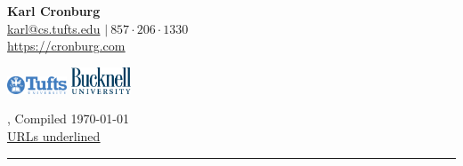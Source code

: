 
\usepackage[margin=0.6in]{geometry}
\usepackage[parfill]{parskip}
\usepackage[utf8]{inputenc}
\usepackage{amsmath,amssymb,amsfonts,amsthm}
\usepackage{graphicx} %
\usepackage{setspace} %
\usepackage{hyperref} %
\usepackage{enumitem}
\usepackage{xcolor}
\usepackage{soul}


\hypersetup{
    colorlinks=true,
    linkcolor=blue,
    filecolor=magenta,
    urlcolor=black,
}
 


\usepackage{datetime}



\begin{minipage}{.333 \linewidth}
{\Large {\bf Karl Cronburg}\\
{\small \href{mailto:karl@cs.tufts.edu}{karl@cs.tufts.edu} %
$\vert~857\cdot206\cdot1330$}\\
\iftoggle{resume}{}{%
{\footnotesize \underline{\href{https://github.com/cronburg}{https://github.com/cronburg}}}\\}
{\footnotesize \underline{\href{https://cronburg.com}{https://cronburg.com}}}}
\end{minipage}
\begin{minipage}{.333 \linewidth}
\begin{center}
\includegraphics[width=67px, height=20px]{tufts-logo.png}\hspace{1cm}
\includegraphics[width=67px, height=30px]{bulogo_blue.png}%
\end{center}
\end{minipage}
\begin{minipage}{.333 \linewidth}
{\footnotesize \hspace*{\fill}\iftoggle{resume}{Resume}{CV}, Compiled \mydate \today\\
\hspace*{\fill}\underline{\href{https://cronburg.com}{URLs underlined}}}%
\end{minipage}

\rule{\linewidth}{1pt}

